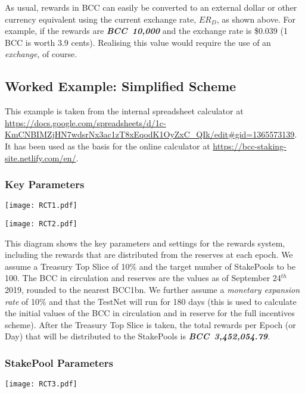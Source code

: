 \documentclass[11pt,a4paper,dvipsnames,twosided,final]{article}
\newcommand{\bcc}{BCC{}}
\newcommand{\BCC}[1]{\textbf{\emph{\bcc~{#1}}}}
\newcommand{\bcc}[1]{Bcc}
\begin{document}
\noindent
As usual, rewards in \bcc{} can easily be converted to an external dollar or other currency equivalent using
the current exchange rate, $ER_D$, as shown %
above.  For example, if the rewards are \BCC{10,000} and the exchange rate is
\$0.039 (1 \bcc{} is worth 3.9 cents).  Realising this value would require the use of an \emph{exchange},
of course.

\clearpage
\subsection{Worked Example: Simplified Scheme}


\begin{minipage}{\textwidth}
  This example is taken from the internal \TBCO{} spreadsheet calculator at
\url{https://docs.google.com/spreadsheets/d/1c-KmCNBIMZjHN7wdsrNx3ac1zT8xEqodK1OyZxC_QIk/edit#gid=1365573139}.
It has been used as the basis for the online calculator at \url{https://bcc-staking-site.netlify.com/en/}.

\subsubsection*{Key Parameters}

\noindent
\vspace{-0.5in}
\texttt{[image: RCT1.pdf]}
\vspace{-2in}

\noindent
\texttt{[image: RCT2.pdf]}
\vspace{-1.9in}

\noindent
This diagram shows the key parameters and settings for the rewards system, including the
rewards that are distributed from the reserves at each epoch.  We assume a Treasury Top Slice
of 10\% and the target number of StakePools to be 100.  The \bcc{} in circulation and reserves
are the values as of September 24$^{th}$ 2019, rounded to the nearest BCC{1bn}.  We further
assume a \emph{monetary expansion rate} of 10\% and that the TestNet will run for 180 days
(this is used to calculate the initial values of the \bcc{} in circulation and in reserve
for the full incentives scheme).  After the Treasury Top Slice is taken, the total
rewards per Epoch (or Day) that will be distributed to the StakePools is \BCC{3,452,054.79}.
\end{minipage}

\clearpage
\subsubsection*{StakePool Parameters}
\texttt{[image: RCT3.pdf]}
\vspace{-0.5in}
\end{document}
